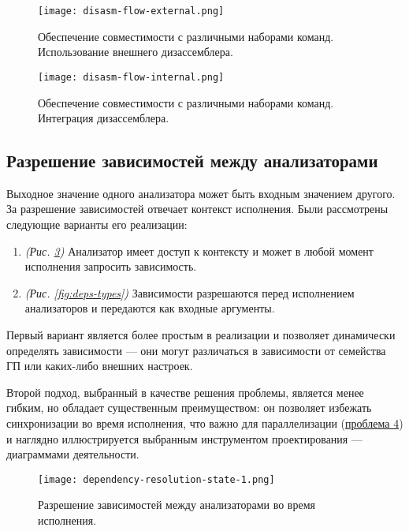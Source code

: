 \documentclass[listings]{labreport}
\begin{document}
\begin{figure}[H]
\centering
\texttt{[image: disasm-flow-external.png]}
\caption{\small{Обеспечение совместимости с различными наборами команд.
    Использование внешнего \newline дизассемблера.}}
\label{fig:disasm-ext}
\end{figure}

\begin{figure}[H]
\centering
\texttt{[image: disasm-flow-internal.png]}
\caption{\small{Обеспечение совместимости с различными наборами команд.
   Интеграция дизассемблера.}}
\label{fig:disasm-int}
\end{figure}

\newpage
\subsection*{Разрешение зависимостей между анализаторами}

Выходное значение одного анализатора может быть входным значением другого.
За разрешение зависимостей отвечает контекст исполнения. Были рассмотрены
следующие варианты его реализации:
\begin{enumerate}[noitemsep,topsep=0em]
\item \textit{(Рис. \ref{fig:deps-state})} Анализатор имеет доступ к контексту
  и может в любой момент исполнения запросить зависимость. 
\item \textit{(Рис. \ref{fig:deps-types})} Зависимости разрешаются перед
  исполнением анализаторов и передаются как входные аргументы.
\end{enumerate}
\vspace{0.4em}

Первый вариант является более простым в реализации и позволяет динамически
определять зависимости — они могут различаться в зависимости от семейства ГП
или каких-либо внешних настроек.

Второй подход, выбранный в качестве решения проблемы, является менее гибким, но
обладает существенным преимуществом: он позволяет избежать синхронизации
во время исполнения, что важно для параллелизации (\uline{проблема 4})
и наглядно иллюстрируется выбранным инструментом проектирования — диаграммами деятельности.

\begin{figure}[H]
\centering
\centering
\texttt{[image: dependency-resolution-state-1.png]}
\caption{\small{Разрешение зависимостей между анализаторами во время исполнения.}}
\label{fig:deps-state}
\end{figure}
\end{document}

